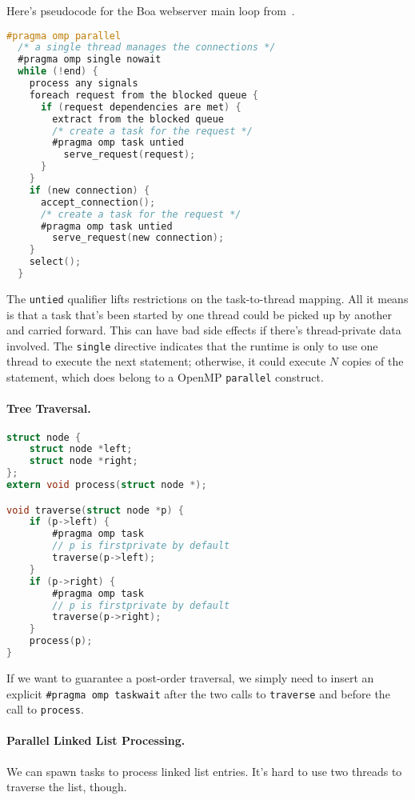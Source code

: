 Here's pseudocode for the Boa webserver main loop from~\cite{Ayguade:2009:DOT:1512157.1512430}.
{\small
\begin{lstlisting}[language=C,morekeywords={foreach,pragma,omp,parallel,single,nowait,task,untied,barrier,taskyield}]
#pragma omp parallel
  /* a single thread manages the connections */
  #pragma omp single nowait
  while (!end) {
    process any signals
    foreach request from the blocked queue {
      if (request dependencies are met) {
        extract from the blocked queue
        /* create a task for the request */
        #pragma omp task untied
          serve_request(request);
      }
    }
    if (new connection) {
      accept_connection();
      /* create a task for the request */
      #pragma omp task untied
        serve_request(new connection);
    }
    select();
  }
\end{lstlisting}
}
The {\tt untied} qualifier lifts restrictions on the task-to-thread mapping.
All it means is that a task that's been started by one thread could be picked up
by another and carried forward. This can have bad side effects if there's
thread-private data involved. The {\tt single} directive indicates that the
runtime is only to use one thread to execute the next statement; otherwise,
it could execute $N$ copies of the statement, which does belong to a
OpenMP {\tt parallel} construct.

\paragraph{Tree Traversal.}
  \begin{lstlisting}[language=C]
struct node {
    struct node *left;
    struct node *right;
};
extern void process(struct node *);

void traverse(struct node *p) {
    if (p->left) {
        #pragma omp task
        // p is firstprivate by default
        traverse(p->left);
    }
    if (p->right) {
        #pragma omp task
        // p is firstprivate by default
        traverse(p->right);
    }
    process(p);
}    
  \end{lstlisting}

If we want to guarantee a post-order traversal,
we simply need to insert an explicit \verb+#pragma omp taskwait+
after the two calls to {\tt traverse} and before the
call to {\tt process}.


\paragraph{Parallel Linked List Processing.} We can spawn 
tasks to process linked list entries. It's hard to
use two threads to traverse the list, though.

